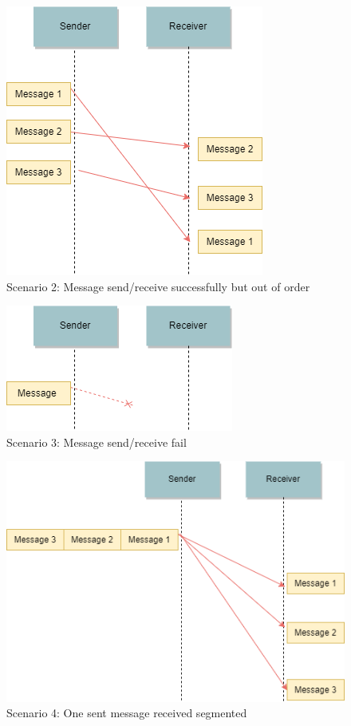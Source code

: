\begin{figure}[ht!]
\centerline{\includegraphics[scale=0.6]{Figures/scenario2}}
 \caption{Scenario 2: Message send/receive successfully but out of order}
\label{scenario2}
\end{figure}

\begin{figure}[ht!]
\centerline{\includegraphics[scale=0.6]{Figures/scenario3}}
 \caption{Scenario 3: Message send/receive fail}
\label{scenario3}
\end{figure}

\begin{figure}[ht!]
\centerline{\includegraphics[scale=0.6]{Figures/scenario4}}
 \caption{Scenario 4: One sent message received segmented}
\label{scenario4}
\end{figure}

